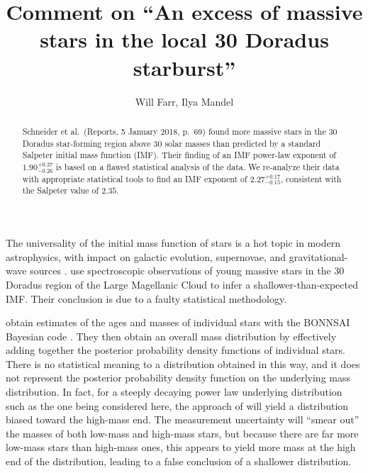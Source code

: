 \documentclass[apjl]{emulateapj}
\newcommand{\onesigrange}[3]{\ensuremath{#1^{+#2}_{-#3}}}
\newcommand{\alpharange}{\onesigrange{2.27}{0.17}{0.15}}
\begin{document}
\title{Comment on ``An excess of massive stars in the local 30 Doradus starburst''}

\author{Will Farr, Ilya Mandel}

\begin{abstract}
Schneider et al.~(Reports, 5 January 2018, p.~69) found more massive stars in the 30 Doradus star-forming region above 30 solar masses than predicted by a standard Salpeter initial mass function (IMF).  Their finding of an IMF power-law exponent of $1.90^{+0.37}_{-0.26}$ is based on a flawed statistical analysis of the data.  We re-analyze their data with appropriate statistical tools to find an IMF exponent of $\alpharange$, consistent with the Salpeter value of $2.35$.
\end{abstract}

\maketitle

The universality of the initial mass function of stars is a hot topic in modern astrophysics, with impact on galactic evolution, supernovae, and gravitational-wave sources \cite{Kroupa:2002,Bastian:2010}.    \citet{Schneider:2018} use spectroscopic observations of young massive stars in the 30 Doradus region of the Large Magellanic Cloud to infer a shallower-than-expected IMF.  Their conclusion is due to a faulty statistical methodology.

\citet{Schneider:2018} obtain estimates of the ages and masses of individual stars with the BONNSAI Bayesian code \cite{Schneider:2017}.  They then obtain an overall mass distribution by effectively adding together the posterior probability density functions of individual stars.  There is no statistical meaning to a distribution obtained in this way, and it does not represent the posterior probability density function on the underlying mass distribution.  In fact, for a steeply decaying power law underlying distribution such as the one being considered here, the approach of \cite{Schneider:2018} will yield a distribution biased toward the high-mass end.  The measurement uncertainty will ``smear out'' the masses of both low-mass and high-mass stars, but because there are far more low-mass stars than high-mass ones, this appears to yield more mass at the high end of the distribution, leading to a false conclusion of a shallower distribution.
\end{document}
